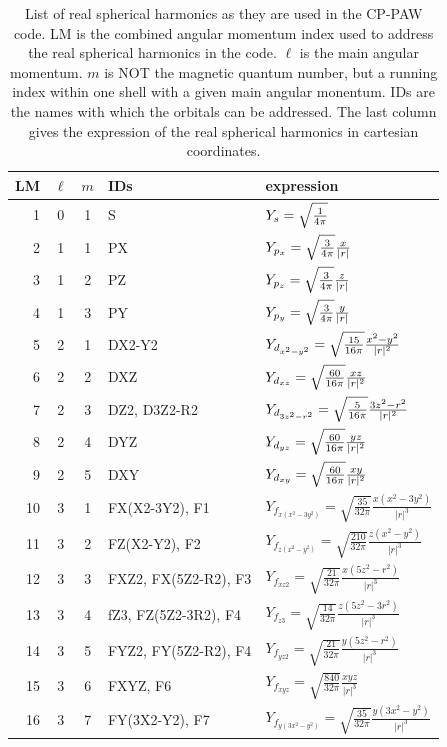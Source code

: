 \documentclass[final,12pt,makeidx,DIV=calc]{article}
\begin{document}
{{{{{{\begin{table}[!hbt]
\caption{\label{tab:realsphericalharmonics}List of real spherical
  harmonics as they are used in the CP-PAW code. LM is the combined
  angular momentum index used to address the real spherical harmonics
  in the code. $\ell$ is the main angular momentum. $m$ is NOT the
  magnetic quantum number, but a running index within one shell with a
  given main angular monentum. IDs are the names with which the
  orbitals can be addressed. The last column gives the expression of
  the real spherical harmonics in cartesian coordinates.}
\begin{center}
\begin{tabular}{|r|c|c|l|l|}
\hline
LM & $\ell$ & $m$ & IDs & expression \\
\hline
1 & 0 & 1 & S   & $Y_s=\sqrt{1\over{4\pi}}$ \\
\hline
2 & 1 & 1 & PX  & $Y_{p_x}=\sqrt{3\over{4\pi}} {x\over{|r|}}$\\
3 & 1 & 2 & PZ  & $Y_{p_z}=\sqrt{3\over{4\pi}} {z\over{|r|}}$\\
4 & 1 & 3 & PY  & $Y_{p_y}=\sqrt{3\over{4\pi}} {y\over{|r|}}$\\
\hline
5 & 2 & 1  & DX2-Y2
                & $Y_{d_{x^2-y^2}}=\sqrt{15\over{16\pi}} {{x^2-y^2}\over{|r|^2}}$\\
6 & 2 & 2 & DXZ & $Y_{d_{xz}}=\sqrt{60\over{16\pi}} {{xz}\over{|r|^2}}$\\
7 & 2 & 3 & DZ2, D3Z2-R2 
                & $Y_{d_{3z^2-r^2}}=\sqrt{5\over{16\pi}} {{3z^2-r^2}\over{|r|^2}}$\\
8 & 2 & 4 & DYZ & $Y_{d_{yz}}=\sqrt{60\over{16\pi}} {{yz}\over{|r|^2}}$\\
9 & 2 & 5 & DXY & $Y_{d_{xy}}=\sqrt{60\over{16\pi}} {{xy}\over{|r|^2}}$\\
\hline
10 & 3 & 1 & FX(X2-3Y2), F1 
   & $Y_{f_{x(x^2-3y^2)}}=\sqrt{\frac{35}{32\pi}} \frac{x(x^2-3y^2)}{|r|^3}$\\
11 & 3 & 2 & FZ(X2-Y2), F2
   & $Y_{f_{z(x^2-y^2)}}=\sqrt{\frac{210}{32\pi}} \frac{z(x^2-y^2)}{|r|^3}$\\
12 & 3 & 3 & FXZ2, FX(5Z2-R2), F3 
   & $Y_{f_{xz2}}=\sqrt{\frac{21}{32\pi}} \frac{x(5z^2-r^2)}{|r|^3}$\\
13 & 3 & 4 & fZ3, FZ(5Z2-3R2), F4
   & $Y_{f_{z3}}=\sqrt{\frac{14}{32\pi}} \frac{z(5z^2-3r^2)}{|r|^3}$\\
14 & 3 & 5 & FYZ2, FY(5Z2-R2), F4
   & $Y_{f_{yz2}}=\sqrt{\frac{21}{32\pi}} \frac{y(5z^2-r^2)}{|r|^3}$\\
15 & 3 & 6 & FXYZ, F6
   & $Y_{f_{xyz}}=\sqrt{\frac{840}{32\pi}} \frac{xyz}{|r|^3}$\\
16 & 3 & 7 & FY(3X2-Y2), F7
   & $Y_{f_{y(3x^2-y^2)}}=\sqrt{\frac{35}{32\pi}} \frac{y(3x^2-y^2)}{|r|^3}$\\
\hline
\end{tabular}
\end{center}
\end{table}


}}}}}}
\end{document}
